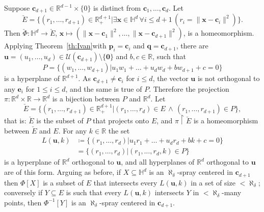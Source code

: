 \documentclass[12pt]{amsart}
\newcommand{\FORALL}[1]{\forall {#1} \, }
\newcommand{\EXISTS}[1]{\exists {#1} \, }
\newcommand{\R}{\mathbb{R}}	%
\newcommand{\AND}{\mathbin{\, \wedge \,}}
\newcommand{\Mid}{\boldsymbol\mid}			%
\newcommand{\set}[1]{\mathopen \{ {#1} \mathclose \}} %
\newcommand{\setof}[2]{\mathopen \{{#1}\Mid{#2} \mathclose\}} %
\renewcommand{\restriction}{\mathop{\upharpoonright}}
\theoremstyle{plain}
\theoremstyle{definition}
\theoremstyle{remark}
\begin{document}
Suppose \( \mathbf{c}_{ d + 1 } \in \R^{ d - 1 } \times \set{0} \) is distinct from \( \mathbf{c}_1 , \dots , \mathbf{c}_d \).
Let
\[
\check{ E } = \setof{ ( r_1 , \dots , r_{ d + 1 } ) \in \R^{ d + 1 }_+}{ \EXISTS{ \mathbf{x} \in \mathbb{H}^d } \FORALL{i \leq d + 1 } ( r_i = \| \mathbf{x} - \mathbf{c}_i \|^2 ) } .
\] 
Then \( \check{ \Phi } \colon \mathbb{H}^d \to \check{ E } \), \( \mathbf{x} \mapsto( \| \mathbf{x} - \mathbf{c}_1 \|^2 , \dots , \| \mathbf{x} - \mathbf{c}_{ d + 1 } \|^2 ) \), is a homeomorphism.
Applying Theorem~\ref{th:Ivan}with \( \mathbf{p}_i = \mathbf{c}_i \) and \( \mathbf{q} = \mathbf{c}_{ d + 1 } \), there are \( \mathbf{u} = ( u_1 , \dots , u_d ) \in \mathcal{U} ( \mathbf{c}_{ d + 1 } ) \setminus \set{ \mathbf{0} } \) and \( b , c \in \R \), such that 
\[ 
 P = \setof{ ( w_1 , \dots , w_{ d + 1 } ) }{ u_1 w_1 + \dots + u_d w_d + b w_{ d + 1 } + c = 0 } 
\] 
is a hyperplane of \( \R^{ d + 1 } \).
As \( \mathbf{c}_{ d + 1 } \neq \mathbf{c}_i \) for \( i \leq d \), the vector \( \mathbf{u} \) is not orthogonal to any \( \mathbf{e}_i \) for \( 1 \leq i \leq d \), and the same is true of \( P \).
Therefore the projection \( \pi \colon \R^d \times \R \to \R^d \) is a bijection between \( P \) and \( \R^d \).
Let
\[
\check{ E } = \setof{ ( r_1 , \dots , r_{ d + 1 } ) \in \R^{ d + 1 } _+ }{ ( r_1 , \dots , r_d ) \in E \AND ( r_1 , \dots , r_{ d + 1 } ) \in P } ,
\]
that is: \( \check{ E } \) is the subset of \( P \) that projects onto \( E \), and \( \pi \restriction \check{ E } \) is a homeomorphism between \( \check{ E } \) and \( E \). 
For any \( k \in \R \) the set 
\[
\begin{split}
L ( \mathbf{u} , k ) & \coloneqq \setof{ ( r_1 , \dots , r_d ) }{ u_1 r_1 + \dots + u_d r_d + b k + c = 0 } 
\\
 & = \setof{ ( r_1 , \dots , r_d ) }{ ( r_1 , \dots , r_d , k ) \in P } 
\end{split}
\] 
is a hyperplane of \( \R^d \) orthogonal to \( \mathbf{u} \), and all hyperplanes of \( \R^d \) orthogonal to \( \mathbf{u} \) are of this form.
Arguing as before, if \( X \subseteq \mathbb{H}^d \) is an \( \aleph_ \delta \)-spray centered in \( \mathbf{c}_{ d + 1 } \) then \( \Phi [ X ] \) is a subset of \( E \) that intersects every \( L ( \mathbf{u} , k ) \) in a set of size \( < \aleph_ \delta \); conversely if \( Y \subseteq E \) is such that every \( L ( \mathbf{u} , k ) \) intersects \( Y \) in \( < \aleph_ \delta \)-many points, then \( \Phi ^{ - 1 } [ Y ] \) is an \( \aleph_ \delta \)-spray centered in \( \mathbf{c}_{ d + 1 } \).
\end{document}
